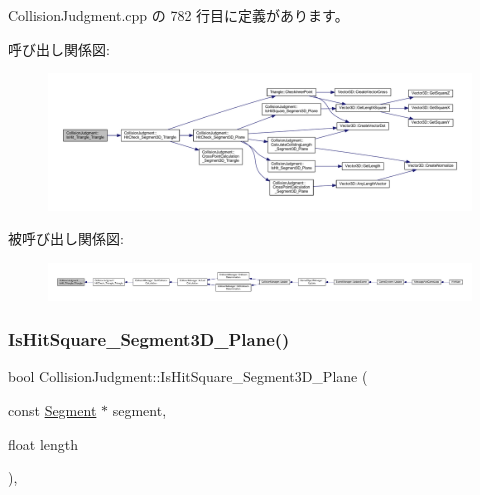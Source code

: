  Collision\+Judgment.\+cpp の 782 行目に定義があります。

呼び出し関係図\+:\nopagebreak
\begin{figure}[H]
\begin{center}
\leavevmode
\includegraphics[width=350pt]{class_collision_judgment_a96728b80c578cd9566677788b5e5fad8_cgraph}
\end{center}
\end{figure}
被呼び出し関係図\+:
\nopagebreak
\begin{figure}[H]
\begin{center}
\leavevmode
\includegraphics[width=350pt]{class_collision_judgment_a96728b80c578cd9566677788b5e5fad8_icgraph}
\end{center}
\end{figure}
\mbox{\label{class_collision_judgment_a85481c15b123971458a612a31b1cc57e}} 
\subsubsection{\texorpdfstring{Is\+Hit\+Square\+\_\+\+Segment3\+D\+\_\+\+Plane()}{IsHitSquare\_Segment3D\_Plane()}}
{\footnotesize\ttfamily bool Collision\+Judgment\+::\+Is\+Hit\+Square\+\_\+\+Segment3\+D\+\_\+\+Plane (\begin{DoxyParamCaption}\item[{const \mbox{\hyperlink{class_segment}{Segment}} $\ast$}]{segment,  }\item[{float}]{length }\end{DoxyParamCaption})\hspace{0.3cm}{\ttfamily [static]}, {\ttfamily [private]}}



